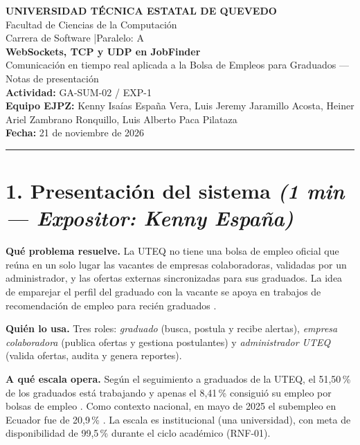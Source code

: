\documentclass[11pt,a4paper]{article}
\newcommand{\expo}[2]{\hfill{\small\textit{(#1 — Expositor: #2)}}}
\begin{document}
\begin{center}
  {\large\bfseries UNIVERSIDAD TÉCNICA ESTATAL DE QUEVEDO}\\[2pt]
  Facultad de Ciencias de la Computación\\
  Carrera de Software \quad|\quad Paralelo: A\\[8pt]
  {\Large\bfseries WebSockets, TCP y UDP en JobFinder}\\[2pt]
  {\normalsize Comunicación en tiempo real aplicada a la Bolsa de Empleos para
  Graduados — Notas de presentación}\\[6pt]
  \textbf{Actividad:} GA-SUM-02 / EXP-1\\[2pt]
  \textbf{Equipo EJPZ:} Kenny Isaías España Vera, Luis Jeremy Jaramillo Acosta,
  Heiner Ariel Zambrano Ronquillo, Luis Alberto Paca Pilataza\\[2pt]
  \textbf{Fecha:} 21 de noviembre de 2026
\end{center}
\vspace{-4pt}\noindent\rule{\linewidth}{0.4pt}

\section*{1. Presentación del sistema \expo{1 min}{Kenny España}}
\textbf{Qué problema resuelve.} La UTEQ no tiene una bolsa de empleo oficial que
reúna en un solo lugar las vacantes de empresas colaboradoras, validadas por un
administrador, y las ofertas externas sincronizadas para sus graduados. La idea de
emparejar el perfil del graduado con la vacante se apoya en trabajos de
recomendación de empleo para recién graduados \cite{ref1}.

\textbf{Quién lo usa.} Tres roles: \emph{graduado} (busca, postula y recibe
alertas), \emph{empresa colaboradora} (publica ofertas y gestiona postulantes) y
\emph{administrador UTEQ} (valida ofertas, audita y genera reportes).

\textbf{A qué escala opera.} Según el seguimiento a graduados de la UTEQ, el
51,50\,\% de los graduados está trabajando y apenas el 8,41\,\% consiguió su
empleo por bolsas de empleo \cite{uteq2022seguimiento}. Como contexto nacional,
en mayo de 2025 el subempleo en Ecuador fue de 20,9\,\% \cite{inec2025enemduMayo}.
La escala es institucional (una universidad), con meta de disponibilidad de
99,5\,\% durante el ciclo académico (RNF-01).
\end{document}
